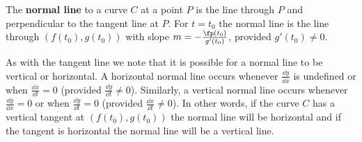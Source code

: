 \begin{definition}\label{def:normal_par}
The \textbf{normal line} to a curve $C$ at a point $P$ is the line through $P$ and perpendicular to the tangent line at $P$. For $t=t_0$ the normal line is the line through $(f(t_0), g(t_0))$ with slope $m=-\frac{\fp(t_0)}{g'(t_0)}$, provided $g'(t_0) \neq 0$.
\end{definition}

As with the tangent line we note that it is possible for a normal line to be vertical or horizontal. A horizontal normal line occurs whenever $\frac{\dd y}{\dd x}$ is undefined or when $\frac{\dd x}{\dd t} = 0$ (provided $\frac{\dd y}{\dd t} \neq 0$). Similarly, a vertical normal line occurs whenever $\frac{\dd y}{\dd x} = 0$ or when $\frac{\dd y}{\dd t} = 0$ (provided $\frac{\dd x}{\dd t} \neq 0$). In other words, if the curve $C$ has a vertical tangent  at $(f(t_0), g(t_0))$ the normal line will be horizontal and if the tangent is horizontal the normal line will be a vertical line.


